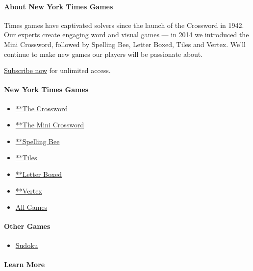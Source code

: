 \hypertarget{about-new-york-times-games}{%
\paragraph{About New York Times
Games}\label{about-new-york-times-games}}

Times games have captivated solvers since the launch of the Crossword in
1942. Our experts create engaging word and visual games --- in 2014 we
introduced the Mini Crossword, followed by Spelling Bee, Letter Boxed,
Tiles and Vertex. We'll continue to make new games our players will be
passionate about.

\href{https://www.nytimes3xbfgragh.onion/subscription/games?campaignId=9W9LL}{Subscribe
now} for unlimited access.

\hypertarget{new-york-times-games-1}{%
\paragraph{New York Times Games}\label{new-york-times-games-1}}

\begin{itemize}
\tightlist
\item
  \href{/crosswords/game/daily}{**The Crossword}
\item
  \href{/crosswords/game/mini}{**The Mini Crossword}
\item
  \href{/puzzles/spelling-bee}{**Spelling Bee}
\item
  \href{/puzzles/tiles}{**Tiles}
\item
  \href{/puzzles/letter-boxed}{**Letter Boxed}
\item
  \href{/puzzles/vertex}{**Vertex}
\item
  \href{/crosswords}{All Games}
\end{itemize}

\hypertarget{other-games-1}{%
\paragraph{Other Games}\label{other-games-1}}

\begin{itemize}
\tightlist
\item
  \href{/puzzles/sudoku}{Sudoku}
\end{itemize}

\hypertarget{learn-more}{%
\paragraph{Learn More}\label{learn-more}}

